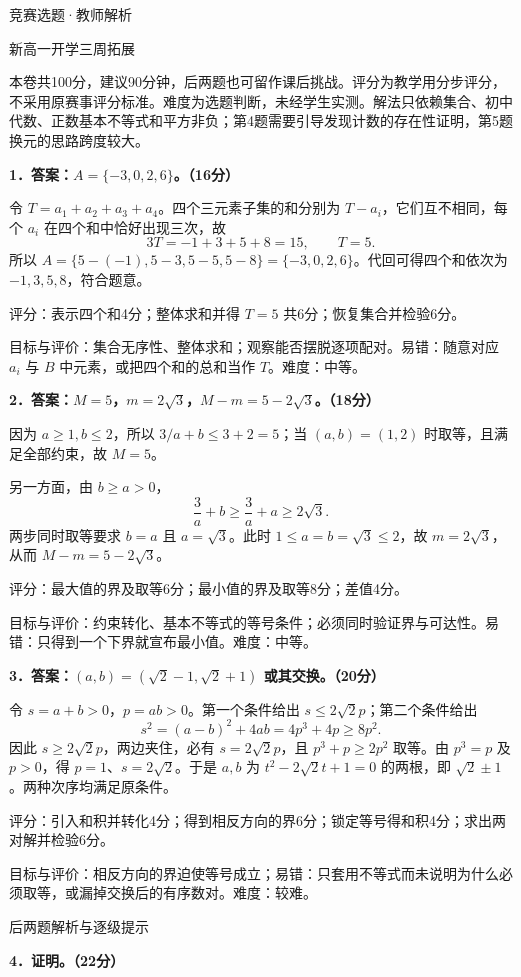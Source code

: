 \documentclass[UTF8,a4paper,11pt]{ctexart}
\begin{document}
\begin{center}{\LARGE 竞赛选题·教师解析}\par 新高一开学三周拓展\end{center}
本卷共100分，建议90分钟，后两题也可留作课后挑战。评分为教学用分步评分，不采用原赛事评分标准。难度为选题判断，未经学生实测。解法只依赖集合、初中代数、正数基本不等式和平方非负；第4题需要引导发现计数的存在性证明，第5题换元的思路跨度较大。

\textbf{1．答案：$A=\{-3,0,2,6\}$。（16分）}

令 $T=a_1+a_2+a_3+a_4$。四个三元素子集的和分别为 $T-a_i$，它们互不相同，每个 $a_i$ 在四个和中恰好出现三次，故
\[3T=-1+3+5+8=15,\qquad T=5.\]
所以 $A=\{5-(-1),5-3,5-5,5-8\}=\{-3,0,2,6\}$。代回可得四个和依次为 $-1,3,5,8$，符合题意。

评分：表示四个和4分；整体求和并得 $T=5$ 共6分；恢复集合并检验6分。

目标与评价：集合无序性、整体求和；观察能否摆脱逐项配对。易错：随意对应 $a_i$ 与 $B$ 中元素，或把四个和的总和当作 $T$。难度：中等。

\textbf{2．答案：$M=5$，$m=2\sqrt3$，$M-m=5-2\sqrt3$。（18分）}

因为 $a\ge1,b\le2$，所以 $3/a+b\le3+2=5$；当 $(a,b)=(1,2)$ 时取等，且满足全部约束，故 $M=5$。

另一方面，由 $b\ge a>0$，
\[\frac3a+b\ge\frac3a+a\ge2\sqrt3.\]
两步同时取等要求 $b=a$ 且 $a=\sqrt3$。此时 $1\le a=b=\sqrt3\le2$，故 $m=2\sqrt3$，从而 $M-m=5-2\sqrt3$。

评分：最大值的界及取等6分；最小值的界及取等8分；差值4分。

目标与评价：约束转化、基本不等式的等号条件；必须同时验证界与可达性。易错：只得到一个下界就宣布最小值。难度：中等。

\textbf{3．答案：$(a,b)=(\sqrt2-1,\sqrt2+1)$ 或其交换。（20分）}

令 $s=a+b>0$，$p=ab>0$。第一个条件给出 $s\le2\sqrt2p$；第二个条件给出
\[s^2=(a-b)^2+4ab=4p^3+4p\ge8p^2.\]
因此 $s\ge2\sqrt2p$，两边夹住，必有 $s=2\sqrt2p$，且 $p^3+p\ge2p^2$ 取等。由 $p^3=p$ 及 $p>0$，得 $p=1$、$s=2\sqrt2$。于是 $a,b$ 为 $t^2-2\sqrt2t+1=0$ 的两根，即 $\sqrt2\pm1$。两种次序均满足原条件。

评分：引入和积并转化4分；得到相反方向的界6分；锁定等号得和积4分；求出两对解并检验6分。

目标与评价：相反方向的界迫使等号成立；易错：只套用不等式而未说明为什么必须取等，或漏掉交换后的有序数对。难度：较难。
\newpage
\begingroup\small\setlength{\parskip}{3pt}
\begin{center}{\Large 后两题解析与逐级提示}\end{center}
\textbf{4．证明。（22分）}
\end{document}
